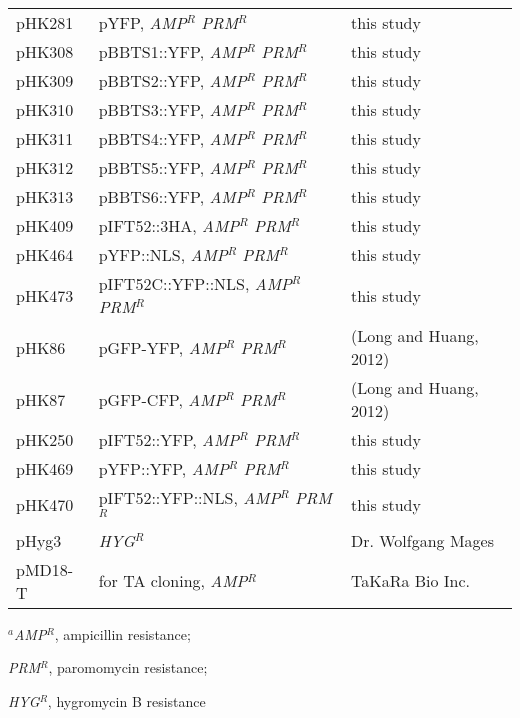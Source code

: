 \begin{table}[!ht]
\begin{tabular}[c]{*{3}{l} @{}}
pHK281 & pYFP, \textit{AMP}$^R$ \textit{PRM}$^R$ & this study\\
pHK308 & pBBTS1::YFP, \textit{AMP}$^R$ \textit{PRM}$^R$ & this study\\
pHK309 & pBBTS2::YFP, \textit{AMP}$^R$ \textit{PRM}$^R$ & this study\\
pHK310 & pBBTS3::YFP, \textit{AMP}$^R$ \textit{PRM}$^R$ & this study\\
pHK311 & pBBTS4::YFP, \textit{AMP}$^R$ \textit{PRM}$^R$ & this study\\
pHK312 & pBBTS5::YFP, \textit{AMP}$^R$ \textit{PRM}$^R$ & this study\\
pHK313 & pBBTS6::YFP, \textit{AMP}$^R$ \textit{PRM}$^R$ & this study\\
pHK409 & pIFT52::3HA, \textit{AMP}$^R$ \textit{PRM}$^R$ & this study\\
pHK464 & pYFP::NLS, \textit{AMP}$^R$ \textit{PRM}$^R$ & this study\\
pHK473 & pIFT52C::YFP::NLS, \textit{AMP}$^R$ \textit{PRM}$^R$ & this study\\
pHK86 & pGFP-YFP, \textit{AMP}$^R$ \textit{PRM}$^R$ & (Long and Huang, 2012)\\
pHK87 & pGFP-CFP, \textit{AMP}$^R$ \textit{PRM}$^R$ & (Long and Huang, 2012)\\
pHK250 & pIFT52::YFP, \textit{AMP}$^R$ \textit{PRM}$^R$ & this study\\
pHK469 & pYFP::YFP, \textit{AMP}$^R$ \textit{PRM}$^R$ & this study\\
pHK470 & pIFT52::YFP::NLS, \textit{AMP}$^R$ \textit{PRM}$^R$ & this study\\
pHyg3 & \textit{HYG}$^R$ & Dr. Wolfgang Mages\\
pMD18-T & for TA cloning, \textit{AMP}$^R$ & TaKaRa Bio Inc.\\
\bottomrule
\end{tabular}
\end{table}
$^a$\textit{AMP}$^R$, ampicillin resistance;

\makebox[2mm]{}\textit{PRM}$^R$, paromomycin resistance;

\makebox[2mm]{}\textit{HYG}$^R$, hygromycin B resistance 